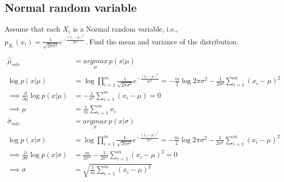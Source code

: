 \documentclass[12pt]{article}
\begin{document}
\subsection{Normal random variable}
Assume that each $X_i$ is a Normal random variable, i.e.,\, $p_{X_i}(x_i)=\frac{1}{\sqrt{2\pi\sigma^2}} e^{-\frac{(x_i-\mu)^2}{2\sigma^2}}$\,.\,Find the mean and variance of the distribution.
\begin{qsolve}
    \begin{align*}
        \hat{\mu}_{mle}                                      & = \underset{\mu}{argmax} \, p(x|\mu)                                                                                                                                  \\
        \log p(x|\mu)                                        & = \log \prod_{i=1}^m \frac{1}{\sqrt{2\pi\sigma^2}} e^{-\frac{(x_i-\mu)^2}{2\sigma^2}} = -\frac{m}{2} \log 2\pi\sigma^2 - \frac{1}{2\sigma^2} \sum_{i=1}^m (x_i-\mu)^2 \\
        \implies \frac{\partial}{\partial \mu} \log p(x|\mu) & = -\frac{1}{\sigma^2} \sum_{i=1}^m (x_i-\mu) = 0                                                                                                                      \\
        \implies \mu                                         & = \frac{1}{m} \sum_{i=1}^m x_i
    \end{align*}
    \begin{align*}
        \hat{\sigma}_{mle}                                         & = \underset{\sigma}{argmax} \, p(x|\sigma)                                                                                                                            \\
        \log p(x|\sigma)                                           & = \log \prod_{i=1}^m \frac{1}{\sqrt{2\pi\sigma^2}} e^{-\frac{(x_i-\mu)^2}{2\sigma^2}} = -\frac{m}{2} \log 2\pi\sigma^2 - \frac{1}{2\sigma^2} \sum_{i=1}^m (x_i-\mu)^2 \\
        \implies \frac{\partial}{\partial \sigma} \log p(x|\sigma) & = \frac{m}{2\sigma^3} - \frac{1}{2\sigma^3} \sum_{i=1}^m (x_i-\mu)^2 = 0                                                                                              \\
        \implies \sigma                                            & = \sqrt{\frac{1}{m} \sum_{i=1}^m (x_i-\mu)^2}
    \end{align*}
\end{qsolve}
\end{document}
